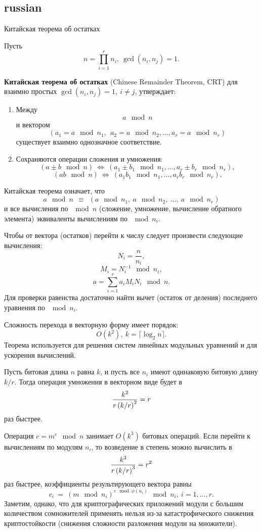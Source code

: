 \subsection{russian}{Китайская теорема об остатках}

Пусть
    \[ n = \prod\limits_{i=1}^{r} n_i, ~ \gcd(n_i, n_j) = 1. \]

 \textbf{Китайская теорема об остатках} (Chinese Remainder Theorem, CRT) для взаимно простых $\gcd(n_i,n_j) = 1, ~ i \neq j$, утверждает:
\begin{enumerate}
    \item Между
        \[ a \mod n \]
        и вектором
        \[ (a_1 = a \mod n_1, ~~ a_2 = a \mod n_2,  \dots,  a_r = a \mod n_r) \]
        существует взаимно однозначное соответствие.
    \item Сохраняются операции сложения и умножения:
        \[ (a \pm b \mod n) ~\Leftrightarrow~ (a_1 \pm b_1 \mod n_1,  \dots,  a_r \pm b_r \mod n_r), \]
        \[ (a b \mod n) ~\Leftrightarrow~ (a_1 b_1 \mod n_1,  \dots,  a_r b_r \mod n_r). \]
\end{enumerate}

Китайская теорема означает, что
    \[ a \mod n ~~\equiv~~ (a \mod n_1, ~ a \mod n_2, ~ \dots, ~ a \mod n_r) \]
и все вычисления по $\mod n$ (сложение, умножение, вычисление обратного элемента) эквиваленты вычислениям по $\mod n_i$.

Чтобы от вектора (остатков) перейти к числу следует произвести следующие вычисления:
        \[ N_i = \frac{n}{n_i}, \]
        \[ M_i = N_i^{-1} \mod n_i, \]
        \[ a = \sum\limits_{i=1}^{r} a_i M_i N_i \mod n. \]
        Для проверки равенства достаточно найти вычет (остаток от деления) последнего уравнения по $\mod n_i$.

        Сложность перехода в векторную форму имеет порядок:
        \[ O(k^2), ~ k = \lceil \log_2 n \rceil. \]
Теорема используется для решения систем линейных модульных уравнений и для ускорения вычислений.

Пусть битовая длина $n$ равна $k$, и пусть все $n_i$ имеют одинаковую битовую длину $k / r$. Тогда операция умножения в векторном виде будет в
    \[ \frac{k^2}{r \left( k \middle/ r \right)^2 } = r \]
раз быстрее.

Операция $c = m^e \mod n$ занимает $O(k^3)$ битовых операций. Если перейти к вычислениям по модулям $n_i$, то возведение в степень можно вычислить в
    \[ \frac{k^3}{r \left( k \middle/ r \right)^3 } = r^2 \]
раз быстрее, коэффициенты результирующего вектора равны
    \[ c_i ~=~ \left( m \mod n_i \right)^{e \mod \phi(n_i)} \mod n_i, ~ i = 1, \dots, r. \]
Заметим, однако, что для криптографических приложений модули с большим количеством сомножителей применять нельзя из-за катастрофического снижения криптостойкости (снижения сложности разложения модули на множители).


